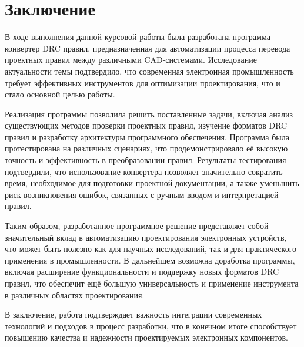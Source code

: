 \chapter*{Заключение}

В ходе выполнения данной курсовой работы
была разработана программа-конвертер DRC правил,
предназначенная для автоматизации процесса перевода проектных правил
между различными CAD-системами.
Исследование актуальности темы подтвердило,
что современная электронная промышленность требует
эффективных инструментов для оптимизации проектирования,
что и стало основной целью работы.

Реализация программы позволила решить поставленные задачи,
включая анализ существующих методов проверки проектных правил,
изучение форматов DRC правил и разработку архитектуры программного обеспечения.
Программа была протестирована на различных сценариях,
что продемонстрировало её высокую точность
и эффективность в преобразовании правил.
Результаты тестирования подтвердили,
что использование конвертера позволяет значительно сократить время,
необходимое для подготовки проектной документации,
а также уменьшить риск возникновения ошибок,
связанных с ручным вводом и интерпретацией правил.

Таким образом, разработанное программное решение представляет
собой значительный вклад в автоматизацию проектирования электронных устройств,
что может быть полезно как для научных исследований,
так и для практического применения в промышленности.
В дальнейшем возможна доработка программы,
включая расширение функциональности и поддержку новых форматов DRC правил,
что обеспечит ещё большую универсальность
и применение инструмента в различных областях проектирования.

В заключение, работа подтверждает важность интеграции современных технологий
и подходов в процесс разработки,
что в конечном итоге способствует повышению качества
и надежности проектируемых электронных компонентов.

